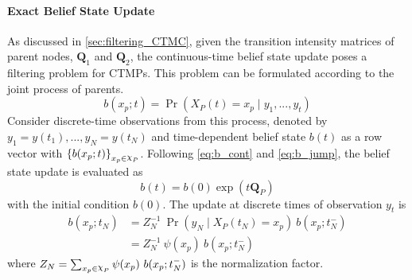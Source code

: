 \paragraph*{Exact Belief State Update}
\label{par:bs_exact}
As discussed in \cref{sec:filtering_CTMC}, given the transition intensity matrices of parent nodes, $ \textbf{Q}_1 $ and $ \textbf{Q}_2 $, the continuous-time belief state update poses a filtering problem for CTMPs. This problem can be formulated according to the joint process of parents.
\begin{equation}
b(x_p; t) = \operatorname{Pr}( X_P(t) = x_{p} \mid y_{1}, ..., y_{t})
\end{equation}
Consider discrete-time observations from this process, denoted by $ y_{1}=y(t_{1}), ..., y_{N}=y(t_{N}) $ and time-dependent belief state $ b(t) $ as a row vector with $ \left\lbrace b(x_p;t)\right\rbrace_{x_p \in \rchi_P} $. Following \autoref{eq:b_cont} and \autoref{eq:b_jump}, the belief state update is evaluated as
\begin{equation}
b(t) = b(0) \exp(t\textbf{Q}_P)
\end{equation}
with the initial condition $ b(0) $.
The update at discrete times of observation $ y_{t} $ is
\begin{align}
b(x_p; t_{N}) &= Z_{N}^{-1}\ {\operatorname{Pr}(y_{N} \mid X_P(t_{N})=x_p)}\ {b(x_p; t_{N}^{-})} \\ & = Z_{N}^{-1}\ \psi(x_p) \ {b(x_p; t_{N}^{-})}
\end{align}
where $ Z_{N} = \sum_{x_p\in \rchi_P} \psi(x_p)\ b(x_p; t_{N}^{-}) $ is the normalization factor.
